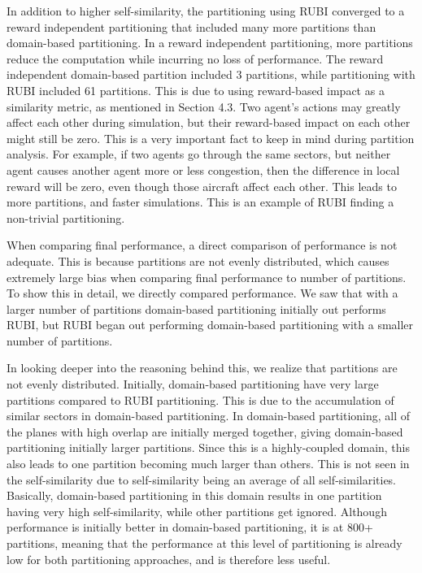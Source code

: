 \documentclass{aamas2014}
\begin{document}
In addition to higher self-similarity, the partitioning using RUBI converged to a reward independent partitioning that included many more partitions than domain-based partitioning. In a reward independent partitioning, more partitions reduce the computation while incurring no loss of performance. The reward independent domain-based partition included 3 partitions, while partitioning with RUBI included 61 partitions. This is due to using reward-based impact as a similarity metric, as mentioned in Section 4.3. Two agent's actions may greatly affect each other during simulation, but their reward-based impact on each other might still be zero. This is a very important fact to keep in mind during partition analysis. For example, if two agents go through the same sectors, but neither agent causes another agent more or less congestion, then the difference in local reward will be zero, even though those aircraft affect each other. This leads to more partitions, and faster simulations. This is an example of RUBI finding a non-trivial partitioning.

When comparing final performance, a direct comparison of performance is not adequate. This is because partitions are not evenly distributed, which causes extremely large bias when comparing final performance to number of partitions. To show this in detail, we directly compared performance. We saw that with a larger number of partitions domain-based partitioning initially out performs RUBI, but RUBI began out performing domain-based partitioning with a smaller number of partitions. 

In looking deeper into the reasoning behind this, we realize that partitions are not evenly distributed. Initially, domain-based partitioning have very large partitions compared to RUBI partitioning. This is due to the accumulation of similar sectors in domain-based partitioning. In domain-based partitioning, all of the planes with high overlap are initially merged together, giving domain-based partitioning initially larger partitions. Since this is a highly-coupled domain, this also leads to one partition becoming much larger than others. This is not seen in the self-similarity due to self-similarity being an average of all self-similarities. Basically, domain-based partitioning in this domain results in one partition having very high self-similarity, while other partitions get ignored. Although performance is initially better in domain-based partitioning, it is at 800+ partitions, meaning that the performance at this level of partitioning is already low for both partitioning approaches, and is therefore less useful.
\end{document}
